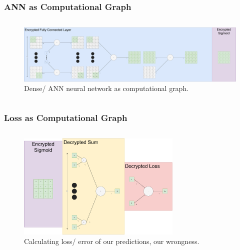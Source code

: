 \documentclass[aspectratio=169]{beamer}
\begin{document}
  \begin{frame}
    \frametitle{ANN as Computational Graph}
    \begin{columns}
      \begin{column}{1\textwidth}
        \begin{figure}[th!]
          \centering
          \includegraphics[width=1\textwidth]{dense_computational_graph.pdf}
          \caption{Dense/ ANN neural network as computational graph. \autocite{repository}}
          \label{fig:dense_computational_graph}
        \end{figure}
      \end{column}
    \end{columns}
  \end{frame}

  \begin{frame}
    \frametitle{Loss as Computational Graph}
    \begin{columns}
      \begin{column}{1\textwidth}
        \begin{figure}[th!]
          \centering
          \includegraphics[width=0.7\textwidth]{loss_computational_graph.pdf}
          \caption{Calculating loss/ error of our predictions, our wrongness. \autocite{repository}}
          \label{fig:loss_computational_graph}
        \end{figure}
      \end{column}
    \end{columns}
  \end{frame}
\end{document}
